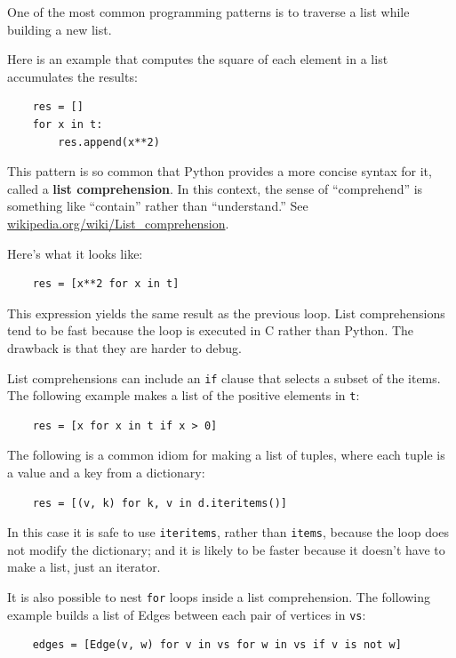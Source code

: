 \documentclass[10pt]{book}
\begin{document}
One of the most common programming patterns is to traverse
a list while building a new list.

Here is an example that computes the square of each element in
a list accumulates the results:

\begin{verbatim}
    res = []
    for x in t:
        res.append(x**2)
\end{verbatim}

This pattern is so common that Python provides a more
concise syntax for it, called a {\bf list comprehension}.
In this context, the sense of ``comprehend'' is something
  like ``contain'' rather than ``understand.''  See
  \url{wikipedia.org/wiki/List_comprehension}.

Here's what it looks like:

\begin{verbatim}
    res = [x**2 for x in t]
\end{verbatim}

This expression yields the same result as the previous loop.  List
comprehensions tend to be fast because the loop is executed in C
rather than Python.  The drawback is that they are harder to debug.

List comprehensions can include an {\tt if} clause that selects a
subset of the items.  The following example makes a
list of the positive elements in {\tt t}:

\begin{verbatim}
    res = [x for x in t if x > 0]
\end{verbatim}

The following is a common idiom for making a list of tuples, where
each tuple is a value and a key from a dictionary:

\begin{verbatim}
    res = [(v, k) for k, v in d.iteritems()]
\end{verbatim}

In this case it is safe to use
{\tt iteritems}, rather than {\tt items}, because
the loop does not modify the dictionary; and it is likely to be
faster because it doesn't have to make a list, just an iterator.

It is also possible to nest {\tt for} loops inside
a list comprehension.  The following example builds a list
of Edges between each pair of vertices in {\tt vs}:

\begin{verbatim}
    edges = [Edge(v, w) for v in vs for w in vs if v is not w]
\end{verbatim}
\end{document}
